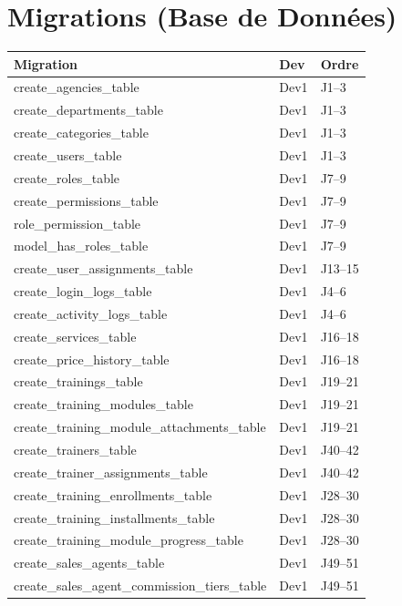 \documentclass[12pt,a4paper]{report}
\begin{document}
\section{Migrations (Base de Données)}

\begin{longtable}{L{6cm} L{3cm} L{5cm}}
    \toprule
    \textbf{Migration} & \textbf{Dev} & \textbf{Ordre} \\
    \midrule
    \endhead
    create\_agencies\_table & Dev1 & J1--3 \\
    create\_departments\_table & Dev1 & J1--3 \\
    create\_categories\_table & Dev1 & J1--3 \\
    create\_users\_table & Dev1 & J1--3 \\
    create\_roles\_table & Dev1 & J7--9 \\
    create\_permissions\_table & Dev1 & J7--9 \\
    role\_permission\_table & Dev1 & J7--9 \\
    model\_has\_roles\_table & Dev1 & J7--9 \\
    create\_user\_assignments\_table & Dev1 & J13--15 \\
    create\_login\_logs\_table & Dev1 & J4--6 \\
    create\_activity\_logs\_table & Dev1 & J4--6 \\
    create\_services\_table & Dev1 & J16--18 \\
    create\_price\_history\_table & Dev1 & J16--18 \\
    create\_trainings\_table & Dev1 & J19--21 \\
    create\_training\_modules\_table & Dev1 & J19--21 \\
    create\_training\_module\_attachments\_table & Dev1 & J19--21 \\
    create\_trainers\_table & Dev1 & J40--42 \\
    create\_trainer\_assignments\_table & Dev1 & J40--42 \\
    create\_training\_enrollments\_table & Dev1 & J28--30 \\
    create\_training\_installments\_table & Dev1 & J28--30 \\
    create\_training\_module\_progress\_table & Dev1 & J28--30 \\
    create\_sales\_agents\_table & Dev1 & J49--51 \\
    create\_sales\_agent\_commission\_tiers\_table & Dev1 & J49--51 \\

\end{longtable}
\end{document}
